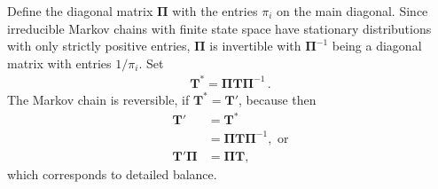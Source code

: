 \documentclass[preprint]{elsarticle}
\newcommand\given{{\,|\,}}
\newcommand\ie{{\it i.e.,}}
\newcommand\x[1]{\ensuremath{X_{#1}}}
\begin{document}
Define the diagonal matrix $\mathbf{\Pi}$ with the entries $\pi_i$ on the main diagonal. Since irreducible Markov chains with finite state space have stationary distributions with only strictly positive entries, $\mathbf{\Pi}$ is invertible with $\mathbf{\Pi}^{-1}$ being a diagonal matrix with entries $1/\pi_i$.  Set
\begin{equation}\label{eq:reverse_transition}
\begin{split}
\mathbf{T}^{*}=\mathbf{\Pi}\mathbf{T}\mathbf{\Pi}^{-1}\,.
\end{split}
\end{equation}
The Markov chain is reversible, if $\mathbf{T}^{*}=\mathbf{T}'$, because then
\begin{align}\label{eq:detailed_balance}
  \mathbf{T}' &= \mathbf{T}^{*} \\
             &= \mathbf{\Pi}\mathbf{T}\mathbf{\Pi}^{-1}, \text{ or} \\
  \mathbf{T}'\mathbf{\Pi} &= \mathbf{\Pi T},
\end{align}
which corresponds to detailed balance.
\end{document}
